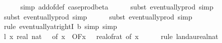 \begin{isabellebody}
\ \ \ \ \isamarkupfalse%
\ {\isacharparenleft}{\kern0pt}simp\ add{\isacharcolon}{\kern0pt}{\isasymepsilon}{\isacharunderscore}{\kern0pt}of{\isacharunderscore}{\kern0pt}def\ case{\isacharunderscore}{\kern0pt}prod{\isacharunderscore}{\kern0pt}beta{\isacharprime}{\kern0pt}{\isacharparenright}{\kern0pt}\isanewline
\ \ \ \ \isamarkupfalse%
\ {\isacharparenleft}{\kern0pt}subst\ eventually{\isacharunderscore}{\kern0pt}prod{}{\isacharprime}{\kern0pt}{\isacharcomma}{\kern0pt}\ simp{\isacharparenright}{\kern0pt}\isanewline
\ \ \ \ \isamarkupfalse%
\ {\isacharparenleft}{\kern0pt}subst\ eventually{\isacharunderscore}{\kern0pt}prod{}{\isacharprime}{\kern0pt}{\isacharcomma}{\kern0pt}\ simp{\isacharparenright}{\kern0pt}\isanewline
\ \ \ \ \isamarkupfalse%
\ {\isacharparenleft}{\kern0pt}subst\ eventually{\isacharunderscore}{\kern0pt}prod{}{\isacharprime}{\kern0pt}{\isacharcomma}{\kern0pt}\ simp{\isacharparenright}{\kern0pt}\isanewline
\ \ \ \ \isamarkupfalse%
\ {\isacharparenleft}{\kern0pt}rule\ eventually{\isacharunderscore}{\kern0pt}at{\isacharunderscore}{\kern0pt}rightI{\isacharbrackleft}{\kern0pt}\ b{\isacharequal}{\kern0pt}{\isachardoublequoteopen}{}{\isachardoublequoteclose}{\isacharbrackright}{\kern0pt}{\isacharcomma}{\kern0pt}\ simp{\isacharcomma}{\kern0pt}\ simp{\isacharparenright}{\kern0pt}\isanewline
\isanewline
\ \ \isamarkupfalse%
\ l{}{\isacharcolon}{\kern0pt}\ {\isachardoublequoteopen}{\isacharparenleft}{\kern0pt}{\isasymlambda}x{\isachardot}{\kern0pt}\ real\ {\isacharparenleft}{\kern0pt}nat\ {\isasymlceil}{}\ {\isacharslash}{\kern0pt}\ {\isacharparenleft}{\kern0pt}{\isasymdelta}{\isacharunderscore}{\kern0pt}of\ x{\isacharparenright}{\kern0pt}\ {\isasymin}\ O{\isacharbrackleft}{\kern0pt}{\isacharquery}{\kern0pt}F{\isacharbrackright}{\kern0pt}{\isacharparenleft}{\kern0pt}{\isasymlambda}x{\isachardot}{\kern0pt}\ {}\ {\isacharslash}{\kern0pt}\ {\isacharparenleft}{\kern0pt}real{\isacharunderscore}{\kern0pt}of{\isacharunderscore}{\kern0pt}rat\ {\isacharparenleft}{\kern0pt}{\isasymdelta}{\isacharunderscore}{\kern0pt}of\ x{\isacharparenright}{\kern0pt}{\isacharparenright}{\kern0pt}\isanewline
\ \ \ \ \isamarkupfalse%
\ {\isacharparenleft}{\kern0pt}rule\ landau{\isacharunderscore}{\kern0pt}real{\isacharunderscore}{\kern0pt}nat{\isacharparenright}{\kern0pt}\isanewline

\end{isabellebody}
